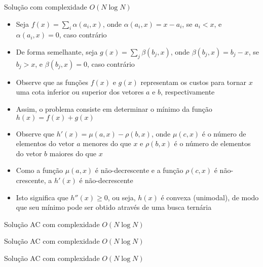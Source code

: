 \begin{frame}[fragile]{Solução com complexidade $O(N\log N)$}

    \begin{itemize}
        \item Seja $f(x) = \sum_i \alpha(a_i, x)$, onde $\alpha(a_i, x) = x - a_i$, se $a_i < x$,
            e $\alpha(a_i, x) = 0$, caso contrário

        \item De forma semelhante, seja $g(x) = \sum_j \beta(b_j, x)$, onde 
            $\beta(b_j, x) = b_j - x$, se $b_j > x$, e $\beta(b_j, x) = 0$, caso contrário

        \item Observe que as funções $f(x)$ e $g(x)$ representam os custos para tornar $x$ uma
            cota inferior ou superior dos vetores $a$ e $b$, respectivamente

        \item Assim, o problema consiste em determinar o mínimo da função $h(x) = f(x) + g(x)$

        \item Observe que $h'(x) = \mu(a, x) - \rho(b, x)$, onde $\mu(c, x)$ é o número de 
            elementos do vetor $a$ menores do que $x$ e $\rho(b, x)$ é o número de elementos do
            vetor $b$ maiores do que $x$

        \item Como a função $\mu(a, x)$ é não-decrescente e a função $\rho(c, x)$ é não-crescente, 
            a $h'(x)$ é não-decrescente

        \item Isto significa que $h''(x) \geq 0$, ou seja, $h(x)$ é convexa (unimodal),
            de modo que seu mínimo pode ser obtido através de uma busca ternária
   \end{itemize}

\end{frame}

\begin{frame}[fragile]{Solução AC com complexidade $O(N\log N)$}
\end{frame}

\begin{frame}[fragile]{Solução AC com complexidade $O(N\log N)$}
\end{frame}

\begin{frame}[fragile]{Solução AC com complexidade $O(N\log N)$}
\end{frame}
